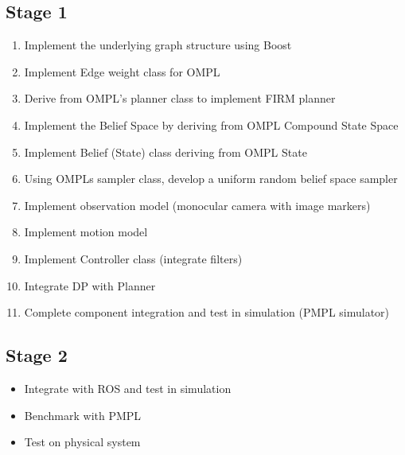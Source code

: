 \subsection{Stage 1}
\begin{enumerate}
 \item Implement the underlying graph structure using Boost
 \item Implement Edge weight class for OMPL
 \item Derive from OMPL’s planner class to implement FIRM planner
 \item Implement the Belief Space by deriving from OMPL Compound State Space
 \item Implement Belief (State) class deriving from OMPL State
 \item Using OMPLs sampler class, develop a uniform random belief space sampler
 \item Implement observation model (monocular camera with image markers)
 \item Implement motion model
 \item Implement Controller class (integrate filters)
 \item Integrate DP with Planner
 \item Complete component integration and test in simulation (PMPL simulator)
\end{enumerate}

\subsection{Stage 2}

\begin{itemize}
 \item Integrate with ROS and test in simulation
 \item Benchmark with PMPL
 \item Test on physical system
\end{itemize}


